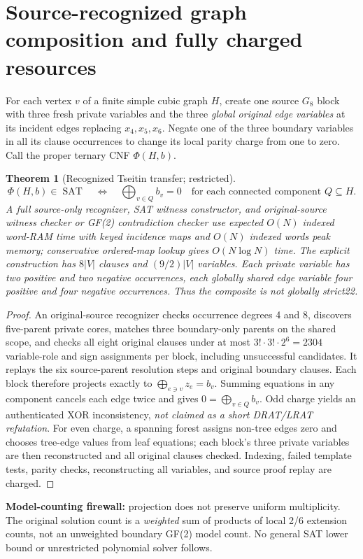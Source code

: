 \documentclass[10pt]{article}
\newtheorem{theorem}{Theorem}
\begin{document}
\section{Source-recognized graph composition and fully charged resources}
For each vertex $v$ of a finite simple cubic graph $H$, create one source $G_8$ block with three fresh private variables and the three \emph{global original edge variables} at its incident edges replacing $x_4,x_5,x_6$. Negate one of the three boundary variables in all its clause occurrences to change its local parity charge from one to zero. Call the proper ternary CNF $\Phi(H,b)$.
\begin{theorem}[Recognized Tseitin transfer; restricted]
\[
\Phi(H,b)\in\operatorname{SAT}\quad\Longleftrightarrow\quad
\bigoplus_{v\in Q}b_v=0\quad\text{for each connected component }Q\subseteq H.
\]
A full source-only recognizer, SAT witness constructor, and original-source witness checker or GF(2) contradiction checker use expected $O(N)$ indexed word-RAM time with keyed incidence maps and $O(N)$ indexed words peak memory; conservative ordered-map lookup gives $O(N\log N)$ time. The explicit construction has $8|V|$ clauses and $(9/2)|V|$ variables. Each private variable has two positive and two negative occurrences, each globally shared edge variable \emph{four positive and four negative occurrences}. Thus the composite is \emph{not globally strict22}.
\end{theorem}
\begin{proof}
An original-source recognizer checks occurrence degrees 4 and 8, discovers five-parent private cores, matches three boundary-only parents on the shared scope, and checks all eight original clauses under at most $3!\cdot3!\cdot2^6=2304$ variable-role and sign assignments per block, including unsuccessful candidates. It replays the six source-parent resolution steps and original boundary clauses. Each block therefore projects exactly to $\bigoplus_{e\ni v}z_e=b_v$. Summing equations in any component cancels each edge twice and gives $0=\bigoplus_{v\in Q}b_v$. Odd charge yields an authenticated XOR inconsistency, \emph{not claimed as a short DRAT/LRAT refutation}. For even charge, a spanning forest assigns non-tree edges zero and chooses tree-edge values from leaf equations; each block's three private variables are then reconstructed and all original clauses checked. Indexing, failed template tests, parity checks, reconstructing all variables, and source proof replay are charged.\end{proof}
\noindent\textbf{Model-counting firewall:} projection does not preserve uniform multiplicity. The original solution count is a \emph{weighted} sum of products of local 2/6 extension counts, not an unweighted boundary GF(2) model count. No general SAT lower bound or unrestricted polynomial solver follows.
\end{document}
